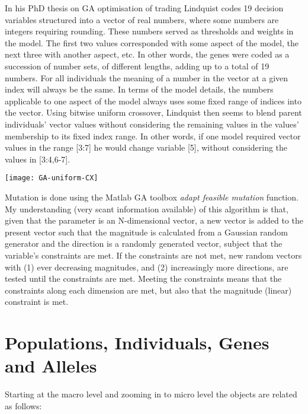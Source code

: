 In his PhD thesis on GA optimisation of trading Lindquist \cite{Lindquist2017} codes 19 decision variables structured into a vector of real numbers, where some numbers are integers requiring rounding.  These numbers served as thresholds and weights in the model.  
The first two values corresponded with some aspect of the model, the next three with another aspect,  etc. In other words, the genes were coded as a succession of number sets, of different lengths, adding up to a total of 19 numbers. For all individuals the meaning of a number in the vector at a given index will always be the same. In terms of the model details, the numbers applicable to one aspect of the model always uses some fixed range of indices into the vector. Using bitwise uniform crossover, Lindquist then seems to blend parent individuals' vector values without considering the remaining values in the values' membership to its fixed index range. In other words, if one model required vector values in the range [3:7] he would change variable [5], without considering the values in [3:4,6-7].
\begin{marginfigure}
\texttt{[image: GA-uniform-CX]}
\end{marginfigure}
Mutation is done using the Matlab GA toolbox \textit{adapt feasible mutation} function. My understanding (very scant information available) of this algorithm is that, given that the parameter is an N-dimensional vector, a new vector is added to the present vector such that the magnitude is calculated from a Gaussian random generator and the direction is a randomly generated vector, subject that the variable's constraints are met. If the constraints are not met, new random vectors with (1) ever decreasing magnitudes, and (2) increasingly more directions, are tested until the constraints are met. Meeting the constraints means that the constraints along each dimension are met, but also that the magnitude (linear) constraint is met.

\section{Populations, Individuals, Genes and Alleles}

Starting at the macro level and zooming in to micro level the objects are related as follows:

